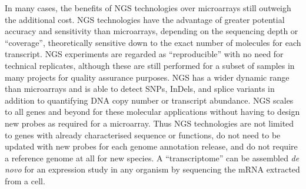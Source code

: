 In many cases, the benefits of \gls{NGS} technologies over microarrays still outweigh the additional cost. \gls{NGS} technologies have the advantage of greater potential accuracy and sensitivity than microarrays, depending on the sequencing depth or ``coverage'', theoretically sensitive down to the exact number of molecules for each transcript. \gls{NGS} experiments are regarded as ``reproducible'' with no need for technical replicates, although these are still performed for a subset of samples in many projects for quality assurance purposes. \gls{NGS} has a wider dynamic range than microarrays and is able to detect \glspl{SNP}, \glspl{InDel}, and splice variants in addition to quantifying DNA copy number or transcript abundance. \gls{NGS} scales to all genes and beyond for these molecular applications without having to design new probes as required for a microarray. Thus \gls{NGS} technologies are not limited to genes with already characterised sequence or functions, do not need to be updated with new probes for each genome annotation release, and do not require a reference genome at all for new species. A ``transcriptome'' can be assembled \textit{de novo} for an expression study in any organism by sequencing the mRNA extracted from a cell.


